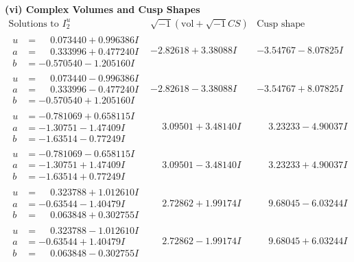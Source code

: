 \documentclass[1p]{elsarticle_modified}
\theoremstyle{definition}
\newcommand{\I}{\sqrt{-1}}
\begin{document}
\newpage\flushleft \textbf{(vi) Complex Volumes and Cusp Shapes}
$$\begin{array}{c|c|c}  
\text{Solutions to }I^u_{2}& \I (\text{vol} + \sqrt{-1}CS) & \text{Cusp shape}\\
 \hline 
\begin{aligned}
u &= \phantom{-}0.073440 + 0.996386 I \\
a &= \phantom{-}0.333996 + 0.477240 I \\
b &= -0.570540 - 1.205160 I\end{aligned}
 & -2.82618 + 3.38088 I & -3.54767 - 8.07825 I \\ \hline\begin{aligned}
u &= \phantom{-}0.073440 - 0.996386 I \\
a &= \phantom{-}0.333996 - 0.477240 I \\
b &= -0.570540 + 1.205160 I\end{aligned}
 & -2.82618 - 3.38088 I & -3.54767 + 8.07825 I \\ \hline\begin{aligned}
u &= -0.781069 + 0.658115 I \\
a &= -1.30751 - 1.47409 I \\
b &= -1.63514 - 0.77249 I\end{aligned}
 & \phantom{-}3.09501 + 3.48140 I & \phantom{-}3.23233 - 4.90037 I \\ \hline\begin{aligned}
u &= -0.781069 - 0.658115 I \\
a &= -1.30751 + 1.47409 I \\
b &= -1.63514 + 0.77249 I\end{aligned}
 & \phantom{-}3.09501 - 3.48140 I & \phantom{-}3.23233 + 4.90037 I \\ \hline\begin{aligned}
u &= \phantom{-}0.323788 + 1.012610 I \\
a &= -0.63544 - 1.40479 I \\
b &= \phantom{-}0.063848 + 0.302755 I\end{aligned}
 & \phantom{-}2.72862 + 1.99174 I & \phantom{-}9.68045 - 6.03244 I \\ \hline\begin{aligned}
u &= \phantom{-}0.323788 - 1.012610 I \\
a &= -0.63544 + 1.40479 I \\
b &= \phantom{-}0.063848 - 0.302755 I\end{aligned}
 & \phantom{-}2.72862 - 1.99174 I & \phantom{-}9.68045 + 6.03244 I \\ \hline\begin{aligned}

\end{aligned}
\end{array}$$
\end{document}
